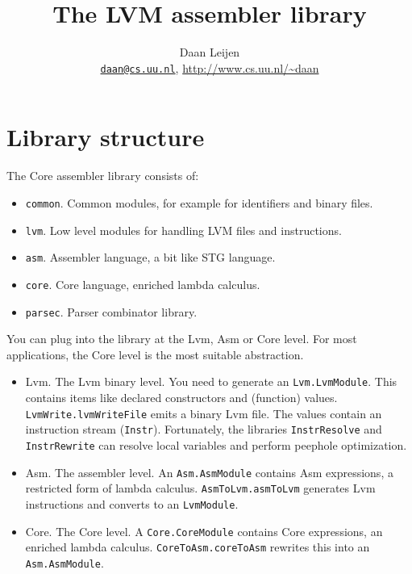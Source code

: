 \documentclass[a4paper,dvips]{article}
\newcommand{\email}[1]{\href{mailto:#1}{\texttt{#1}}}
\newcommand{\code}[1]{\texttt{#1}}
\begin{document}
\title{The LVM assembler library}
\author{Daan Leijen\\
\email{daan@cs.uu.nl}, \url{http://www.cs.uu.nl/~daan}}
\maketitle

\section{Library structure}

The Core assembler library consists of:

\begin{itemize}
\item \code{common}. Common modules, for example for identifiers and binary files.
\item\code{lvm}.    Low level modules for handling LVM files and instructions.
\item\code{asm}.    Assembler language, a bit like STG language.
\item\code{core}.   Core language, enriched lambda calculus.
\item\code{parsec}. Parser combinator library.
\end{itemize}

You can plug into the library at the Lvm, Asm or Core level. For
most applications, the Core level is the most suitable abstraction.

\begin{itemize}
\item Lvm.  The Lvm binary level. You need to generate an \code{Lvm.LvmModule}.
        This contains items like declared constructors and (function) values.
        \code{LvmWrite.lvmWriteFile} emits a binary Lvm file.
        The values contain an instruction stream (\code{Instr}). Fortunately,
        the libraries \code{InstrResolve} and \code{InstrRewrite} can resolve local
        variables and perform peephole optimization.

\item Asm.  The assembler level. An \code{Asm.AsmModule} contains Asm expressions,
        a restricted form of lambda calculus. \code{AsmToLvm.asmToLvm} generates
        Lvm instructions and converts to an \code{LvmModule}.

\item Core.  The Core level. A \code{Core.CoreModule} contains Core expressions,
        an enriched lambda calculus. \code{CoreToAsm.coreToAsm} rewrites this into
        an \code{Asm.AsmModule}.
\end{itemize}
\end{document}
